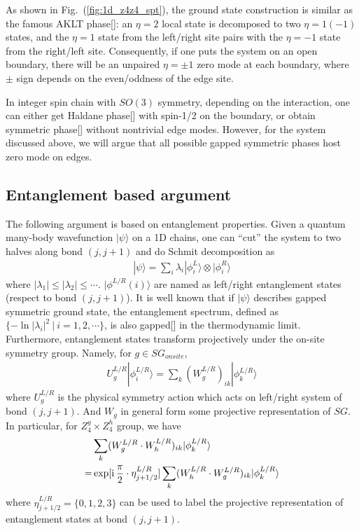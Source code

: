 \documentclass[reprint,amsmath,amssymb,aps,pra,]{revtex4-1}
\newcommand{\ii}{\mathrm{i}\,} %
\begin{document}
As shown in Fig.~(\ref{fig:1d_z4z4_spt}), the ground state construction is similar as the famous AKLT phase[]: an $\eta=2$ local state is decomposed to two $\eta=1(-1)$ states, and the $\eta=1$ state from the left/right site pairs with the $\eta=-1$ state from the right/left site.
Consequently, if one puts the system on an open boundary, there will be an unpaired $\eta=\pm1$ zero mode at each boundary, where $\pm$ sign depends on the even/oddness of the edge site.

In integer spin chain with $SO(3)$ symmetry, depending on the interaction, one can either get Haldane phase[] with spin-1/2 on the boundary, or obtain symmetric phase[] without nontrivial edge modes.
However, for the system discussed above, we will argue that all possible gapped symmetric phases host zero mode on edges.

\subsection{Entanglement based argument}
The following argument is based on entanglement properties.
Given a quantum many-body wavefunction $|\psi\rangle$ on a 1D chains, one can ``cut'' the system to two halves along bond $(j,j+1)$ and do Schmit decomposition as
\begin{align}
  |\psi\rangle=\sum_i\lambda_i|\phi^L_i\rangle\otimes|\phi^R_i\rangle
  \label{}
\end{align}
where $|\lambda_1|\le|\lambda_2|\le\cdots$. 
$|\phi^{L/R}(i)\rangle$ are named as left/right entanglement states (respect to bond $(j,j+1)$).
It is well known that if $|\psi\rangle$ describes gapped symmetric ground state, the entanglement spectrum, defined as $\{-\ln|\lambda_i|^2\ |\ i=1,2,\cdots\}$, is also gapped[] in the thermodynamic limit.
Furthermore, entanglement states transform projectively under the on-site symmetry group.
Namely, for $g\in SG_{onsite}$, 
\begin{align}
  U_{g}^{L/R}|\phi^{L/R}_i\rangle=\sum_k (W_{g}^{L/R})_{ik}|\phi^{L/R}_k\rangle
  \label{}
\end{align}
where $U_{g}^{L/R}$ is the physical symmetry action which acts on left/right system of bond $(j,j+1)$.
And $W_g$ in general form some projective representation of $SG$.
In particular, for $Z_4^g\times Z_4^h$ group, we have
\begin{align}
  &\sum_{k}(W_{g}^{L/R}\cdot W_h^{L/R})_{ik}|\phi^{L/R}_k\rangle\notag\\
  =&\exp[\ii\frac{\pi}{2}\cdot\eta^{L/R}_{j+1/2}]\sum_{k} (W_h^{L/R}\cdot W_g^{L/R})_{ik}|\phi^{L/R}_k\rangle
  \label{}
\end{align}
where $\eta^{L/R}_{j+1/2}=\{0,1,2,3\}$ can be used to label the projective representation of entanglement states at bond $(j,j+1)$.
\end{document}
